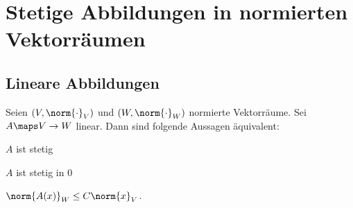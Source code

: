 \section{Stetige Abbildungen in normierten Vektorräumen}
\subsection{Lineare Abbildungen}
\begin{satz}\label{lineare_abbildung:stetigkeitssatz}
    Seien \( (V,\norm{\cdot}_{V}) \) und \( (W,\norm{\cdot}_{W}) \) normierte Vektorräume.
    Sei \( A\maps V\to W \) linear.
    Dann sind folgende Aussagen äquivalent:
    \begin{eigenschaftenenumerate}
        \item \label{lineare_abbildung:stetigkeitssatz:stetig} \( A \) ist stetig
        \item \label{lineare_abbildung:stetigkeitssatz:stetig_in_null} \( A \) ist stetig in \( 0 \)
        \item \label{lineare_abbildung:stetigkeitssatz:norm_beschraenkt} \( \norm{A(x)}_{W}\leq C\norm{x}_{V} \).
    \end{eigenschaftenenumerate}
    
\end{satz}
